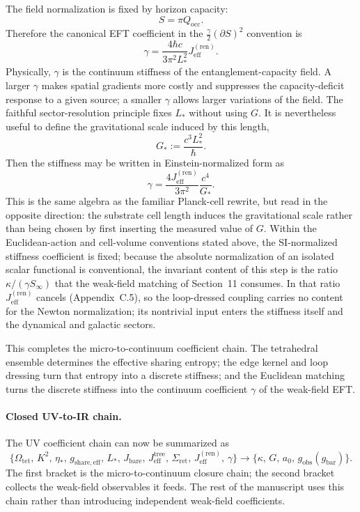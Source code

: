 \documentclass[11pt]{article}
\begin{document}
The field normalization is fixed by horizon capacity:
\[
S=\pi Q_{\mathrm{occ}}.
\]
Therefore the canonical EFT coefficient in the $\frac{\gamma}{2}(\partial S)^2$ convention is
\[
\gamma=\frac{4\hbar c}{3\pi^2L_*^2}J_{\mathrm{eff}}^{(\mathrm{ren})}.
\]
Physically, $\gamma$ is the continuum stiffness of the entanglement-capacity field. A larger $\gamma$ makes spatial gradients more costly and suppresses the capacity-deficit response to a given source; a smaller $\gamma$ allows larger variations of the field.
The faithful sector-resolution principle fixes $L_*$ without using $G$. It is nevertheless useful to define the gravitational scale induced by this length,
\[
G_*:=\frac{c^3L_*^2}{\hbar}.
\]
Then the stiffness may be written in Einstein-normalized form as
\[
\gamma=\frac{4J_{\mathrm{eff}}^{(\mathrm{ren})}}{3\pi^2}\frac{c^4}{G_*}.
\]
This is the same algebra as the familiar Planck-cell rewrite, but read in the opposite direction: the substrate cell length induces the gravitational scale rather than being chosen by first inserting the measured value of $G$. Within the Euclidean-action and cell-volume conventions stated above, the SI-normalized stiffness coefficient is fixed; because the absolute normalization of an isolated scalar functional is conventional, the invariant content of this step is the ratio $\kappa/(\gamma S_\infty)$ that the weak-field matching of Section~11 consumes. In that ratio $J_{\mathrm{eff}}^{(\mathrm{ren})}$ cancels (Appendix~C.5), so the loop-dressed coupling carries no content for the Newton normalization; its nontrivial input enters the stiffness itself and the dynamical and galactic sectors.

This completes the micro-to-continuum coefficient chain. The tetrahedral ensemble determines the effective sharing entropy; the edge kernel and loop dressing turn that entropy into a discrete stiffness; and the Euclidean matching turns the discrete stiffness into the continuum coefficient $\gamma$ of the weak-field EFT.

\paragraph{Closed UV-to-IR chain.}
The UV coefficient chain can now be summarized as
\[
\{\Omega_{\mathrm{tet}},\,K^2,\,\eta_*,\,g_{\mathrm{share,eff}},\,L_*,\,J_{\mathrm{bare}},\,J_{\mathrm{eff}}^{\mathrm{tree}},\,\Sigma_{\mathrm{ret}},\,J_{\mathrm{eff}}^{(\mathrm{ren})},\,\gamma\}
\longrightarrow
\{\kappa,\,G,\,a_0,\,g_{\mathrm{obs}}(g_{\mathrm{bar}})\}.
\]
The first bracket is the micro-to-continuum closure chain; the second bracket collects the weak-field observables it feeds. The rest of the manuscript uses this chain rather than introducing independent weak-field coefficients.
\end{document}
